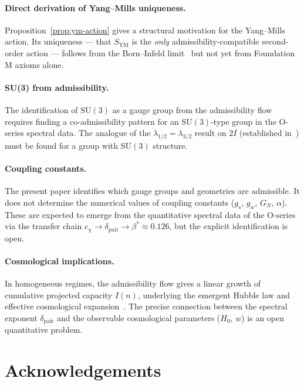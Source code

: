 \documentclass[11pt,a4paper]{article}
\begin{document}
    \paragraph{Direct derivation of Yang--Mills uniqueness.}
      Proposition~\ref{prop:ym-action} gives a structural motivation for the
      Yang--Mills action.
      Its uniqueness — that $S_{\mathrm{YM}}$ is the \emph{only} admissibility-compatible
      second-order action — follows from the Born--Infeld limit~\cite{BornInfeld}
      but not yet from Foundation M axioms alone.

    \paragraph{SU(3) from admissibility.}
      The identification of $\mathrm{SU}(3)$ as a gauge group from the admissibility
      flow requires finding a co-admissibility pattern for an $\mathrm{SU}(3)$-type
      group in the O-series spectral data.
      The analogue of the $\lambda_{1/2} = \lambda_{3/2}$ result on $2I$ (established
      in~\cite{Q2}) must be found for a group with $\mathrm{SU}(3)$ structure.

    \paragraph{Coupling constants.}
      The present paper identifies which gauge groups and geometries are admissible.
      It does not determine the numerical values of coupling constants ($g_s$, $g_w$,
      $G_N$, $\alpha$).
      These are expected to emerge from the quantitative spectral data of the O-series
      via the transfer chain $c_\chi \to \delta_{\mathrm{pair}} \to \beta^* \approx 0.126$,
      but the explicit identification is open.

    \paragraph{Cosmological implications.}
      In homogeneous regimes, the admissibility flow gives a linear growth of cumulative
      projected capacity $I(n)$, underlying the emergent Hubble law and effective
      cosmological expansion~\cite{Cosmochrony}.
      The precise connection between the spectral exponent $\delta_{\mathrm{pair}}$
      and the observable cosmological parameters ($H_0$, $w$) is an open quantitative
      problem.

  \section*{Acknowledgements}
\end{document}
